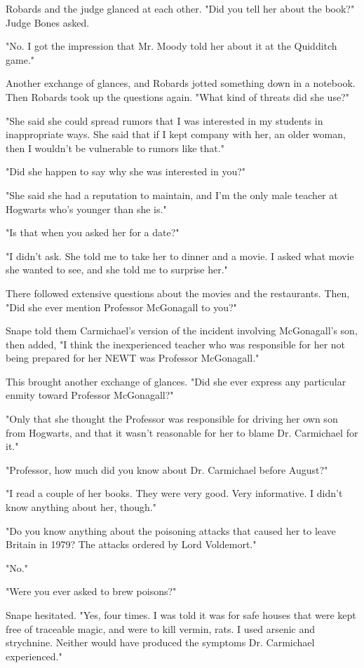 \documentclass[a4paper,11pt]{article}
\begin{document}
Robards and the judge glanced at each other. "Did you tell her about the book?" Judge Bones asked.

"No. I got the impression that Mr. Moody told her about it at the Quidditch game."

Another exchange of glances, and Robards jotted something down in a notebook. Then Robards took up the questions again. "What kind of threats did she use?"

"She said she could spread rumors that I was interested in my students in inappropriate ways. She said that if I kept company with her, an older woman, then I wouldn't be vulnerable to rumors like that."

"Did she happen to say why she was interested in you?"

"She said she had a reputation to maintain, and I'm the only male teacher at Hogwarts who's younger than she is."

"Is that when you asked her for a date?"

"I didn't ask. She told me to take her to dinner and a movie. I asked what movie she wanted to see, and she told me to surprise her."

There followed extensive questions about the movies and the restaurants. Then, "Did she ever mention Professor McGonagall to you?"

Snape told them Carmichael's version of the incident involving McGonagall's son, then added, "I think the inexperienced teacher who was responsible for her not being prepared for her NEWT was Professor McGonagall."

This brought another exchange of glances. "Did she ever express any particular enmity toward Professor McGonagall?"

"Only that she thought the Professor was responsible for driving her own son from Hogwarts, and that it wasn't reasonable for her to blame Dr. Carmichael for it."

"Professor, how much did you know about Dr. Carmichael before August?"

"I read a couple of her books. They were very good. Very informative. I didn't know anything about her, though."

"Do you know anything about the poisoning attacks that caused her to leave Britain in 1979? The attacks ordered by Lord Voldemort."

"No."

"Were you ever asked to brew poisons?"

Snape hesitated. "Yes, four times. I was told it was for safe houses that were kept free of traceable magic, and were to kill vermin, rats. I used arsenic and strychnine. Neither would have produced the symptoms Dr. Carmichael experienced."
\end{document}
